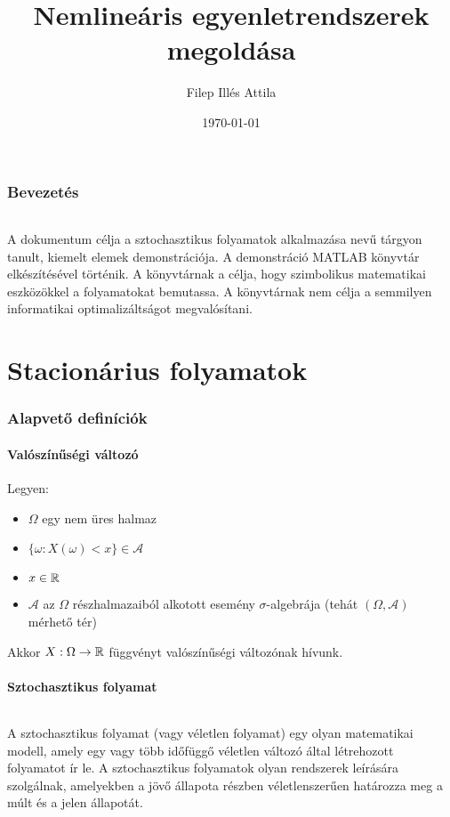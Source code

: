 \documentclass[11pt,a4pape,draftr]{article}
\title{Nemlineáris egyenletrendszerek megoldása}
\date{\today}
\author{Filep Illés Attila}
\begin{document}
 	\maketitle
  	\newpage

	\begin{abstract}

	\end{abstract}
	\tableofcontents
	\section*{Bevezetés}
		\paragraph{}
			A dokumentum célja a sztochasztikus folyamatok alkalmazása nevű tárgyon tanult, kiemelt elemek demonstrációja. A demonstráció MATLAB könyvtár elkészítésével történik. A könyvtárnak a célja, hogy szimbolikus matematikai eszközökkel a folyamatokat bemutassa. A könyvtárnak nem célja a semmilyen informatikai optimalizáltságot megvalósítani.
	\part{Stacionárius folyamatok}
		\section{Alapvető definíciók}
			\subsection{Valószínűségi változó}
				Legyen:
				\begin{itemize}
					\item $\Omega$ egy nem üres halmaz
					\item $\{\omega : X(\omega) < x\} \in \mathcal{A}$
					\item $x \in \Bbb{R}$
					\item $\mathcal{A}$ az $\Omega$ részhalmazaiból alkotott esemény $\sigma$-algebrája (tehát $(\Omega, \mathcal{A})$ mérhető tér)
				\end{itemize}
				Akkor $X: \Omega \to \Bbb{R}$ függvényt valószínűségi változónak hívunk.
			\subsection{Sztochasztikus folyamat}
				\paragraph{}
					A sztochasztikus folyamat (vagy véletlen folyamat) egy olyan matematikai modell, amely egy vagy több időfüggő véletlen változó által létrehozott folyamatot ír le. A sztochasztikus folyamatok olyan rendszerek leírására szolgálnak, amelyekben a jövő állapota részben véletlenszerűen határozza meg a múlt és a jelen állapotát.
\end{document}
